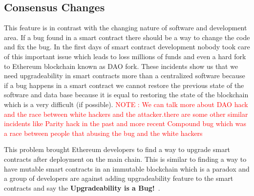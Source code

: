 

\subsection{Consensus Changes}

This feature is in contrast with the changing nature of software and development area. If a bug found in a smart contract there should be a way to change the code and fix the bug. In the first days of smart contract development nobody took care of this important issue which leads to loss millions of funds and even a hard fork to Ethereum blockchain known as DAO fork. These incidents show us that we need upgradeability in smart contracts more than a centralized software because if a bug happens in a smart contract we cannot restore the previous state of the software and data base because it is equal to restoring the state of the blockchain which is a very difficult (if possible). \textcolor{red}{NOTE : We can talk more about DAO hack and the race between white hackers and the attacker.there are some other similar incidents like Parity hack in the past and more recent Compound bug which was a race between people that abusing the bug and the white hackers}

This problem brought Ethereum developers to find a way to upgrade smart contracts after deployment on the main chain. This is similar to finding a way to have mutable smart contracts in an immutable blockchain which is a paradox and a group of developers are against adding upgradeability feature to the smart contracts and say the \textbf{Upgradeability is a Bug!}~\cite{Upg-Bug}.




